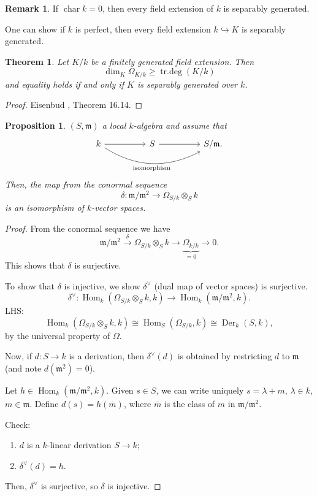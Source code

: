 \documentclass[12pt]{article}
\DeclareMathOperator{\Hom}{Hom}
\DeclareMathOperator{\chara}{char}
\DeclareMathOperator{\Der}{Der}
\DeclareMathOperator{\trdeg}{tr.deg}
\newtheorem*{proposition}{Proposition}
\newtheorem*{theorem}{Theorem}
\theoremstyle{definition}
\newtheorem*{remark}{Remark}
\theoremstyle{remark}
\begin{document}
\begin{remark}
If $\chara k=0$, then every field extension of $k$ is separably generated.

One can show if $k$ is perfect, then every field extension $k\hookrightarrow K$ is separably generated.
\end{remark}

\begin{theorem}
Let $K/k$ be a finitely generated field extension. Then
\[\dim_K\Omega_{K/k}\geq\trdeg(K/k)\]
and equality holds if and only if $K$ is separably generated over $k$.
\end{theorem}

\begin{proof}
Eisenbud \cite{eisenbud2013commutative}, Theorem 16.14.
\end{proof}

\begin{proposition}
$(S,\mathfrak{m})$ a local $k$-algebra and assume that
\[
\begin{tikzcd}
k\arrow[rr]\arrow[rrrr,bend right,"\text{isomorphism}",swap]&&S\arrow[rr]&&S/\mathfrak{m}.
\end{tikzcd}
\]
Then, the map from the conormal sequence
\[\delta:\mathfrak{m}/\mathfrak{m}^2\longrightarrow\Omega_{S/k}\otimes_Sk\]
is an isomorphism of $k$-vector spaces.
\end{proposition}

\begin{proof}
From the conormal sequence we have
\[\mathfrak{m}/\mathfrak{m}^2\overset{\delta}{\longrightarrow}\Omega_{S/k}\otimes_Sk\longrightarrow\underbrace{\Omega_{k/k}}_{=0}\longrightarrow0.\]
This shows that $\delta$ is surjective.

To show that $\delta$ is injective, we show $\delta^{\vee}$ (dual map of vector spaces) is surjective.
\[\delta^{\vee}:\Hom_k(\Omega_{S/k}\otimes_Sk,k)\longrightarrow\Hom_k(\mathfrak{m}/\mathfrak{m}^2,k).\]
LHS:
\[\Hom_k(\Omega_{S/k}\otimes_Sk,k)\cong\Hom_S(\Omega_{S/k},k)\cong\Der_k(S,k),\]
by the universal property of $\Omega$.

Now, if $d:S\rightarrow k$ is a derivation, then $\delta^{\vee}(d)$ is obtained by restricting $d$ to $\mathfrak{m}$ (and note $d(\mathfrak{m}^2)=0$).

Let $h\in\Hom_k(\mathfrak{m}/\mathfrak{m}^2,k)$. Given $s\in S$, we can write uniquely $s=\lambda+m$, $\lambda\in k$, $m\in\mathfrak{m}$. Define $d(s)=h(\overline{m})$, where $\overline{m}$ is the class of $m$ in $\mathfrak{m}/\mathfrak{m}^2$.

Check:
\begin{enumerate}[label=\arabic*)]
\item $d$ is a $k$-linear derivation $S\rightarrow k$;
\item $\delta^{\vee}(d)=h.$
\end{enumerate}
Then, $\delta^{\vee}$ is surjective, so $\delta$ is injective.
\end{proof}
\end{document}
